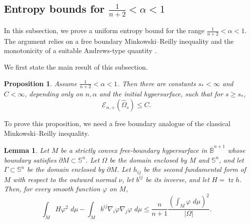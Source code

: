 \documentclass[11pt, reqno]{amsart}
\newtheorem{proposition}[theorem]{Proposition}
\newtheorem{lemma}[theorem]{Lemma}
\theoremstyle{remark}
\theoremstyle{definition}
\numberwithin{equation}{section}
\DeclareMathOperator{\tr}{tr}
\newcommand{\Sph}{\mathbb S}
\newcommand{\B}{\mathbb B}
\newcommand{\dd}{\,d}
\begin{document}
\subsection{Entropy bounds for $\frac{1}{n+2}<\alpha<1$}
In this subsection, we prove a uniform entropy bound for the range $\frac{1}{n+2}<\alpha<1$. The argument relies on a free boundary Minkowski--Reilly inequality and the monotonicity of a suitable Andrews-type quantity \cite{And00}.

We first state the main result of this subsection.
\begin{proposition}
	\label{prop:subunit-entropy-bound-alpha}
	Assume $\frac1{n+2}<\alpha<1$. Then there are constants $s_*<\infty$ and $C<\infty$, depending only on $n,\alpha$ and the initial hypersurface, such that for $s\ge s_*$,
	\begin{equation}\label{eq:subunit-entropy-bound-alpha}
		\mathcal{E}_{\alpha,+}(\widehat\Omega_s)\le C.
	\end{equation}
\end{proposition}

To prove this proposition, we need a free boundary analogue of the classical Minkowski--Reilly inequality.
\begin{lemma}
	\label{lem:FB-Minkowski-Reilly}
    Let $M$ be a strictly convex free-boundary hypersurface in $\overline{\B}^{n+1}$ whose boundary satisfies $\partial M\subset\mathbb{S}^n$.  Let $\Omega$ be the domain enclosed by $M$ and $\mathbb{S}^n$, and let $\Gamma\subset\mathbb{S}^{n}$ be the domain enclosed by $\partial M$.
    Let $h_{ij}$ be the second fundamental form of $M$ with respect to the outward normal $\nu$, let $b^{ij}$ be its
	inverse, and let $H=\tr h$. Then, for every smooth function $\varphi$ on $M$,
	\begin{equation}\label{eq:FB-Minkowski-Reilly}
		\int_M H\varphi^2\,\dd \mu
		-\int_M b^{ij}\nabla_i\varphi\nabla_j\varphi\,\dd \mu
		\le
		\frac n{n+1}
		\frac{\left(\int_M\varphi\,\dd \mu\right)^2}{|\Omega|} .
	\end{equation}
\end{lemma}
\end{document}
